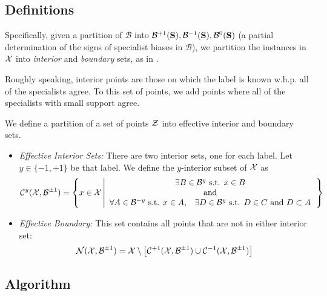 \documentclass{article}
\newcommand{\lrb}[1]{\left[#1\right]}
\newcommand{\cB}{\mathcal{B}}
\newcommand{\universe}[1]{{\cal #1}}
\newcommand{\comment}[3]{\marginpar{\textcolor{#2}{#1: #3}}}
\newcommand{\yoav}[1]{\comment{Yoav}{blue}{#1}}
\begin{document}
\subsection{Definitions}

Specifically, given a partition of $\cB$ into
$\cB^{+1} (\sample{S}),\cB^{-1} (\sample{S}), \cB^{0} (\sample{S})$ 
(a partial determination of the signs of specialist biases in $\cB$), 
we partition the instances in $\universe{X}$ into {\em interior} and
{\em boundary} sets, as in \cite{ChadhuriDasgupta2015}. 

Roughly speaking, interior points are those on which the label is known w.h.p. all of the specialists agree. 
To this set of points, we add points where all of the specialists with small support agree. 

\yoav{I am planning to create a jupyter notebook and generate some figures that will be added here, to aid intuition.}

We define a partition of a set of points $\universe{Z}$ into effective
interior and boundary sets. 
\begin{itemize}
\item {\em  Effective Interior Sets:} There are two interior sets, one for each label.
  Let $y \in \{-1,+1\}$ be that label. We define the $y$-interior subset of $\universe{X}$ as
  \[
  \conform^{y} (\universe{X},\cB^{\pm 1}) =
  \left\{ x \in \universe{X} \left|
  \begin{array}{c}
    \exists B \in \cB^{y} \mbox{ s.t. } x \in B
    \\ \mbox{ and } \\
    \forall A \in \cB^{-y} \mbox{ s.t. } x \in
    A,\;\;\;
    \exists D \in \cB^{y} \mbox{ s.t. } D \in C
    \mbox{ and } D \subset A
  \end{array}
  \right. 
  \right\}
\]
\item {\em Effective Boundary:} This set contains all points that are not in either interior set:
  \[
  \nonconform(\universe{X},\cB^{\pm 1}) =
  \universe{X} \setminus \lrb{ \conform^{+1} (\universe{X},\cB^{\pm 1}) \cup \conform^{-1} (\universe{X},\cB^{\pm 1}) }
  \]
\end{itemize}


\subsection{Algorithm}
\end{document}
